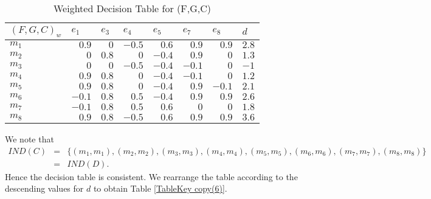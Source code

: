 \documentclass{amsart}
\theoremstyle{plain}
\numberwithin{equation}{section}
\begin{document}
\begin{table}[h] \centering\begin{tabular}{|l|l|l|l|l|l|l|l|}
\hline
$(F,G,C)_{w}$ & $e_{1}$ & $e_{3}$ & $e_{4}$ & $e_{5}$ & $e_{7}$ & $e_{8}$ & $d$ \\ \hline
$m_{1}$ & \multicolumn{1}{|r|}{$0.9$} & \multicolumn{1}{|r|}{$0$} & 
\multicolumn{1}{|r|}{$-0.5$} & \multicolumn{1}{|r|}{$0.6$} & 
\multicolumn{1}{|r|}{$0.9$} & \multicolumn{1}{|r|}{$0.9$} & 
\multicolumn{1}{|r|}{$2.8$} \\ \hline
$m_{2}$ & \multicolumn{1}{|r|}{$0$} & \multicolumn{1}{|r|}{$0.8$} & 
\multicolumn{1}{|r|}{$0$} & \multicolumn{1}{|r|}{$-0.4$} & 
\multicolumn{1}{|r|}{$0.9$} & \multicolumn{1}{|r|}{$0$} & 
\multicolumn{1}{|r|}{$1.3$} \\ \hline
$m_{3}$ & \multicolumn{1}{|r|}{$0$} & \multicolumn{1}{|r|}{$0$} & 
\multicolumn{1}{|r|}{$-0.5$} & \multicolumn{1}{|r|}{$-0.4$} & 
\multicolumn{1}{|r|}{$-0.1$} & \multicolumn{1}{|r|}{$0$} & 
\multicolumn{1}{|r|}{$-1$} \\ \hline
$m_{4}$ & \multicolumn{1}{|r|}{$0.9$} & \multicolumn{1}{|r|}{$0.8$} & 
\multicolumn{1}{|r|}{$0$} & \multicolumn{1}{|r|}{$-0.4$} & 
\multicolumn{1}{|r|}{$-0.1$} & \multicolumn{1}{|r|}{$0$} & 
\multicolumn{1}{|r|}{$1.2$} \\ \hline
$m_{5}$ & \multicolumn{1}{|r|}{$0.9$} & \multicolumn{1}{|r|}{$0.8$} & 
\multicolumn{1}{|r|}{$0$} & \multicolumn{1}{|r|}{$-0.4$} & 
\multicolumn{1}{|r|}{$0.9$} & \multicolumn{1}{|r|}{$-0.1$} & 
\multicolumn{1}{|r|}{$2.1$} \\ \hline
$m_{6}$ & \multicolumn{1}{|r|}{$-0.1$} & \multicolumn{1}{|r|}{$0.8$} & 
\multicolumn{1}{|r|}{$0.5$} & \multicolumn{1}{|r|}{$-0.4$} & 
\multicolumn{1}{|r|}{$0.9$} & \multicolumn{1}{|r|}{$0.9$} & 
\multicolumn{1}{|r|}{$2.6$} \\ \hline
$m_{7}$ & \multicolumn{1}{|r|}{$-0.1$} & \multicolumn{1}{|r|}{$0.8$} & 
\multicolumn{1}{|r|}{$0.5$} & \multicolumn{1}{|r|}{$0.6$} & 
\multicolumn{1}{|r|}{$0$} & \multicolumn{1}{|r|}{$0$} & \multicolumn{1}{|r|}{$1.8$} \\ \hline
$m_{8}$ & \multicolumn{1}{|r|}{$0.9$} & \multicolumn{1}{|r|}{$0.8$} & 
\multicolumn{1}{|r|}{$-0.5$} & \multicolumn{1}{|r|}{$0.6$} & 
\multicolumn{1}{|r|}{$0.9$} & \multicolumn{1}{|r|}{$0.9$} & 
\multicolumn{1}{|r|}{$3.6$} \\ \hline
\end{tabular}\caption{Weighted Decision Table for (F,G,C)}\label{TableKey copy(8)}\end{table}
We note that\begin{eqnarray*}
IND(C)
&=&\{(m_{1},m_{1}),(m_{2},m_{2}),(m_{3},m_{3}),(m_{4},m_{4}),(m_{5},m_{5}),(m_{6},m_{6}),(m_{7},m_{7}),(m_{8},m_{8})\}
\\
&=&IND(D)\text{.}
\end{eqnarray*}Hence the decision table is consistent. We rearrange the table according to
the descending values for $d$ to obtain Table \ref{TableKey copy(6)}.
\end{document}

